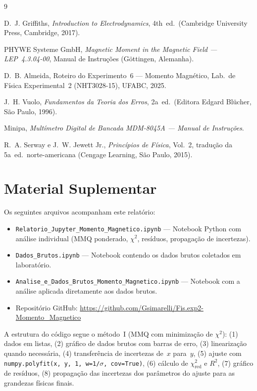 \documentclass[aps, twocolumn, superscriptaddress, floatfix, nofootinbib]{revtex4-2}
\begin{document}
\begin{thebibliography}{9}

D.~J. Griffiths, \textit{Introduction to Electrodynamics}, 4th~ed.\
(Cambridge University Press, Cambridge, 2017).

PHYWE Systeme GmbH, \textit{Magnetic Moment in the Magnetic Field ---
LEP~4.3.04-00}, Manual de Instruções (Göttingen, Alemanha).

D.~B. Almeida, Roteiro do Experimento~6 --- Momento Magnético,
Lab.\ de Física Experimental~2 (NHT3028-15), UFABC, 2025.

J.~H. Vuolo, \textit{Fundamentos da Teoria dos Erros}, 2a~ed.\ (Editora
Edgard Blücher, São Paulo, 1996).

Minipa, \textit{Multímetro Digital de Bancada MDM-8045A --- Manual de
Instruções}.

R.~A. Serway e J.~W. Jewett Jr., \textit{Princípios de Física}, Vol.~2,
tradução da 5a~ed.\ norte-americana (Cengage Learning, São Paulo, 2015).

\end{thebibliography}

\appendix

\section{Material Suplementar}

Os seguintes arquivos acompanham este relatório:

\begin{itemize}
  \item \texttt{Relatorio\_Jupyter\_Momento\_Magnetico.ipynb} --- Notebook
    Python com análise individual (MMQ ponderado, $\chi^2$, resíduos,
    propagação de incertezas).
  \item \texttt{Dados\_Brutos.ipynb} --- Notebook contendo os dados brutos
    coletados em laboratório.
  \item \texttt{Analise\_e\_Dados\_Brutos\_Momento\_Magnetico.ipynb} ---
    Notebook com a análise aplicada diretamente aos dados brutos.
  \item Repositório GitHub:
    \url{https://github.com/Gsimarelli/Fis.exp2-Momento_Magnetico}
\end{itemize}

A estrutura do código segue o método~I (MMQ com minimização de $\chi^2$): (1)
dados em listas, (2) gráfico de dados brutos com barras de erro, (3)
linearização quando necessária, (4) transferência de incertezas de~$x$
para~$y$, (5) ajuste com \texttt{numpy.polyfit(x,\,y,\,1,\,w=1/$\sigma$,\,cov=True)},
(6) cálculo de $\chi^2_\text{red}$ e $R^2$, (7) gráfico de resíduos, (8)
propagação das incertezas dos parâmetros do ajuste para as grandezas físicas
finais.
\end{document}
